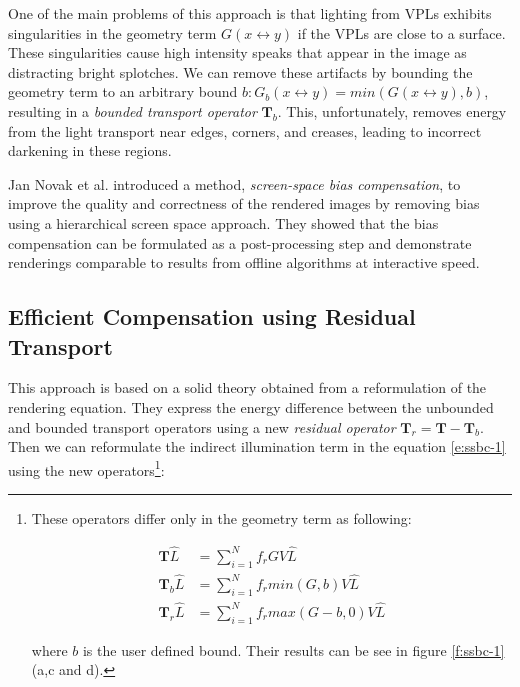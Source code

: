 One of the main problems of this approach is that lighting from VPLs exhibits singularities in the geometry term $G(x\leftrightarrow y)$ if the VPLs are close to a surface. These singularities cause high intensity speaks that appear in the image as distracting bright splotches. We can remove these artifacts by bounding the geometry term to an arbitrary bound $b: G_b(x\leftrightarrow y)=min(G(x\leftrightarrow y),b)$, resulting in a \textit{bounded transport operator} $\mathbf{T}_b$. This, unfortunately, removes energy from the light transport near edges, corners, and creases, leading to incorrect darkening in these regions.

Jan Novak et al. introduced a method, \textit{screen-space bias compensation}\cite{a:Screen-SpaceBiasCompensationfor}, to improve the quality and correctness of the rendered images by removing bias using a hierarchical screen space approach. They showed that the bias compensation can be formulated as a post-processing step and demonstrate renderings comparable to results from offline algorithms at interactive speed.



\subsection{Efficient Compensation using Residual Transport}
This approach is based on a solid theory obtained from a reformulation of the rendering equation. They express the energy difference between the unbounded and bounded transport operators using a new \textit{residual operator} $\mathbf{T}_r = \mathbf{T}-\mathbf{T}_b$. Then we can reformulate the indirect illumination term in the equation \ref{e:ssbc-1} using the new operators\footnote{
These operators differ only in the geometry term as following:

\begin{equation*}
\begin{aligned}
	\mathbf{T}\hat{L}  &=\sum^{N}_{i=1}f_rGV\hat{L}\\
	\mathbf{T}_b\hat{L}&=\sum^{N}_{i=1}f_r min(G,b)V\hat{L}\\
	\mathbf{T}_r\hat{L}&=\sum^{N}_{i=1}f_r max(G-b,0)V\hat{L}
\end{aligned}
\end{equation*}

where $b$ is the user defined bound. Their results can be see in figure \ref{f:ssbc-1}(a,c and d). 
}:


